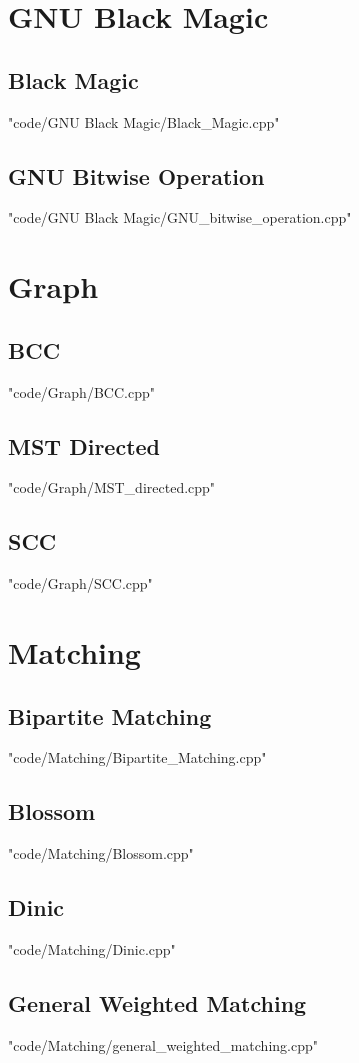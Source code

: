 \documentclass [landscape,8pt,a4paper,twocolumn]{article}
\begin{document}
\section{GNU Black Magic}
\subsection{Black Magic}
 {"code/GNU Black Magic/Black_Magic.cpp"}
\subsection{GNU Bitwise Operation}
 {"code/GNU Black Magic/GNU_bitwise_operation.cpp"}
\section{Graph}
\subsection{BCC}
 {"code/Graph/BCC.cpp"}
\subsection{MST Directed}
 {"code/Graph/MST_directed.cpp"}
\subsection{SCC}
 {"code/Graph/SCC.cpp"}
\section{Matching}
\subsection{Bipartite Matching}
 {"code/Matching/Bipartite_Matching.cpp"}
\subsection{Blossom}
 {"code/Matching/Blossom.cpp"}
\subsection{Dinic}
 {"code/Matching/Dinic.cpp"}
\subsection{General Weighted Matching}
 {"code/Matching/general_weighted_matching.cpp"}
\end{document}
